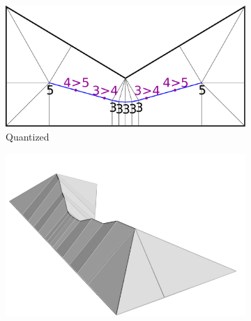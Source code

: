 \begin{figure}
\begin{subfigure}{\figwidth}
\includegraphics[width=\figwidthTwo]{sources/method/surface/rounded.pdf}
\caption{Quantized}\label{3d_surface_overview_rounded}
\end{subfigure}
\begin{subfigure}{\figwidth}\centering
\hspace*{\tempheightTwo}
\includegraphics[width=\figwidthTree]{sources/method/surface/smoothed_cropped.png}

\vspace{\tempheight}


\end{subfigure}
\end{figure}
